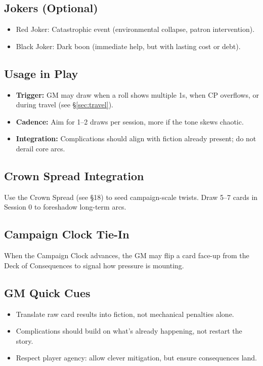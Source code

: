 \subsection{Jokers (Optional)}
\begin{itemize}
  \item Red Joker: Catastrophic event (environmental collapse, patron intervention).
  \item Black Joker: Dark boon (immediate help, but with lasting cost or debt).
\end{itemize}

\subsection{Usage in Play}
\begin{itemize}
  \item \textbf{Trigger:} GM may draw when a roll shows multiple 1s, when CP overflows, or during travel (see \S\ref{sec:travel}).
  \item \textbf{Cadence:} Aim for 1--2 draws per session, more if the tone skews chaotic.
  \item \textbf{Integration:} Complications should align with fiction already present; do not derail core arcs.
\end{itemize}

\subsection{Crown Spread Integration}
Use the Crown Spread (see \S18) to seed campaign-scale twists. Draw 5--7 cards in Session 0 to foreshadow long-term arcs.

\subsection{Campaign Clock Tie-In}
When the Campaign Clock advances, the GM may flip a card face-up from the Deck of Consequences to signal how pressure is mounting.

\subsection{GM Quick Cues}
\begin{itemize}
  \item Translate raw card results into fiction, not mechanical penalties alone.
  \item Complications should build on what’s already happening, not restart the story.
  \item Respect player agency: allow clever mitigation, but ensure consequences land.
\end{itemize}
